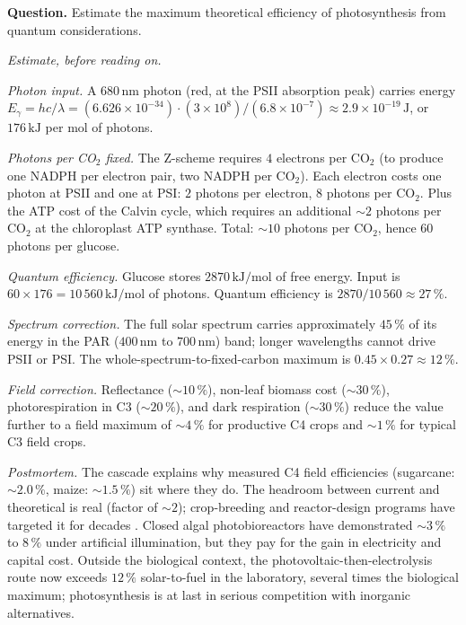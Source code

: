 \begin{estimation}
\textbf{Question.} Estimate the maximum theoretical efficiency of
photosynthesis from quantum considerations.

\smallskip
\textit{Estimate, before reading on.}

\smallskip
\emph{Photon input.} A $680\,\text{nm}$ photon (red, at the PSII
absorption peak) carries energy $E_\gamma = hc/\lambda = (6.626 \times
10^{-34}) \cdot (3 \times 10^8) / (6.8 \times 10^{-7}) \approx 2.9
\times 10^{-19}\,\text{J}$, or $176\,\text{kJ}$ per mol of photons.

\emph{Photons per CO$_2$ fixed.} The Z-scheme requires $4$ electrons
per CO$_2$ (to produce one NADPH per electron pair, two NADPH per
CO$_2$). Each electron costs one photon at PSII and one at PSI:
$2$ photons per electron, $8$ photons per CO$_2$. Plus the ATP cost
of the Calvin cycle, which requires an additional $\sim 2$ photons
per CO$_2$ at the chloroplast ATP synthase. Total: $\sim 10$ photons
per CO$_2$, hence $60$ photons per glucose.

\emph{Quantum efficiency.} Glucose stores $2870\,\text{kJ}/\text{mol}$
of free energy. Input is $60 \times 176 = 10\,560\,\text{kJ}/\text{mol}$
of photons. Quantum efficiency is $2870 / 10\,560 \approx 27\,\%$.

\emph{Spectrum correction.} The full solar spectrum carries
approximately $45\,\%$ of its energy in the PAR ($400\,\text{nm}$ to
$700\,\text{nm}$) band; longer wavelengths cannot drive PSII or PSI.
The whole-spectrum-to-fixed-carbon maximum is $0.45 \times 0.27 \approx
12\,\%$.

\emph{Field correction.} Reflectance ($\sim 10\,\%$), non-leaf biomass
cost ($\sim 30\,\%$), photorespiration in C3 ($\sim 20\,\%$), and
dark respiration ($\sim 30\,\%$) reduce the value further to a field
maximum of $\sim 4\,\%$ for productive C4 crops and $\sim 1\,\%$ for
typical C3 field crops.

\smallskip
\textit{Postmortem.} The cascade explains why measured C4 field
efficiencies (sugarcane: $\sim 2.0\,\%$, maize: $\sim 1.5\,\%$) sit
where they do. The headroom between current and theoretical is
real (factor of $\sim 2$); crop-breeding and reactor-design programs
have targeted it for decades \cite{paper:v6c02-zhu-photosynthesis-2010}.
Closed algal photobioreactors have demonstrated $\sim 3\,\%$ to
$8\,\%$ under artificial illumination, but they pay for the gain in
electricity and capital cost. Outside the biological context, the
photovoltaic-then-electrolysis route now exceeds $12\,\%$
solar-to-fuel in the laboratory, several times the biological
maximum; photosynthesis is at last in serious competition with
inorganic alternatives.
\end{estimation}

